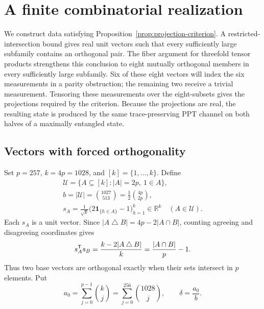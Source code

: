 \section{A finite combinatorial realization}\label{sec:combinatorial}

We construct data satisfying Proposition~\ref{prop:projection-criterion}.
A restricted-intersection bound gives real unit vectors such that every
sufficiently large subfamily contains an orthogonal pair.  The fiber
argument for threefold tensor products strengthens this conclusion to
eight mutually orthogonal members in every sufficiently large subfamily.
Six of these eight vectors will index the six measurements in a parity
obstruction; the remaining two receive a trivial measurement.  Tensoring
these measurements over the eight-subsets gives the projections required
by the criterion.  Because the projections are real, the resulting state
is produced by the same trace-preserving PPT channel on both halves of a
maximally entangled state.

\subsection{Vectors with forced orthogonality}

Set \(p=257\), \(k=4p=1028\), and \([k]=\{1,\ldots,k\}\).  Define
\begin{equation}\label{eq:combinatorial-base}
 \begin{gathered}
 \mathcal U=\{A\subseteq[k]: |A|=2p,\ 1\in A\},\\
 b=|\mathcal U|=\binom{1027}{513}
              =\frac12\binom{4p}{2p},\\
 s_A=\frac{1}{\sqrt k}
       \bigl(2\mathbf1_{\{h\in A\}}-1\bigr)_{h=1}^k
       \in\mathbb R^k
       \quad(A\in\mathcal U).
 \end{gathered}
\end{equation}
Each \(s_A\) is a unit vector.  Since
\(|A\mathbin{\triangle}B|=4p-2|A\cap B|\), counting agreeing and
disagreeing coordinates gives
\begin{equation}\label{eq:combinatorial-inner-product}
 s_A^{\mathsf T}s_B
 =\frac{k-2|A\mathbin{\triangle}B|}{k}
 =\frac{|A\cap B|}{p}-1.
\end{equation}
Thus two base vectors are orthogonal exactly when their sets intersect
in \(p\) elements.  Put
\begin{equation}\label{eq:combinatorial-delta}
 a_0=\sum_{j=0}^{p-1}\binom{k}{j}
     =\sum_{j=0}^{256}\binom{1028}{j},
 \qquad \delta=\frac{a_0}{b}.
\end{equation}

